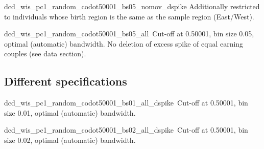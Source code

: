 \documentclass[a4paper,11pt]{scrartcl}
\begin{document}
\begin{appendix}
		\renewcommand{\dcdnoteA}{Note: Discontinuity estimated for the distribution of the wife's share of household income using a McCrary Test \citeyear{mccrary2008manipulation}. Restricted to married couples where spouses in year t$-1$ are between age 25 and 64, where wife and husband have positive annual income, worked at least one month, and are not in education, vocational training, civil service or parental leave, are not self-employed, and do not receive unemployment benefits or pensions.}

		\renewcommand{\samplenote}{Additionally restricted to individuals whose birth region is the same as the sample region (East/West).}

		{dcd_wis_pc1_random_codot50001_bs05_nomov_dspike}%
		{\samplenote\,\specnote}

		\renewcommand{\samplenote}{}

		\renewcommand{\specnote}{Cut-off at 0.50001, bin size 0.05, optimal (automatic) bandwidth. No deletion of excess spike of equal earning couples (see data section).}

		{dcd_wis_pc1_random_codot50001_bs05_all}%
		{\samplenote\,\specnote}

	\clearpage
	\subsection{Different specifications}
	\setcounter{table}{0}
	\setcounter{figure}{0}

	\renewcommand{\samplenote}{}


		\renewcommand{\specnote}{Cut-off at 0.50001, bin size 0.01, optimal (automatic) bandwidth.}

		{dcd_wis_pc1_random_codot50001_bs01_all_dspike}%
		{\samplenote\,\specnote}



		\renewcommand{\specnote}{Cut-off at 0.50001, bin size 0.02, optimal (automatic) bandwidth.}

		{dcd_wis_pc1_random_codot50001_bs02_all_dspike}%
		{\samplenote\,\specnote}


\end{appendix}
\end{document}
